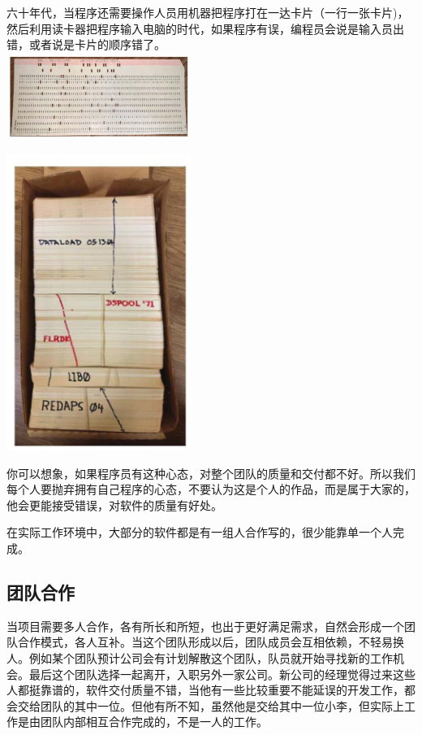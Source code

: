 六十年代，当程序还需要操作人员用机器把程序打在一达卡片（一行一张卡片)，然后利用读卡器把程序输入电脑的时代，如果程序有误，编程员会说是输入员出错，或者说是卡片的顺序错了。\\

\includegraphics[width=6cm]{cleanagile_f33.jpg}


\includegraphics[width=6cm]{cleanagile_f34.jpg}

你可以想象，如果程序员有这种心态，对整个团队的质量和交付都不好。所以我们每个人要抛弃拥有自己程序的心态，不要认为这是个人的作品，而是属于大家的，他会更能接受错误，对软件的质量有好处。

在实际工作环境中，大部分的软件都是有一组人合作写的，很少能靠单一个人完成。

\hypertarget{ux56e2ux961fux7684ux5f62ux6210}{%
\subsection{团队合作}\label{ux56e2ux961fux7684ux5f62ux6210}}

当项目需要多人合作，各有所长和所短，也出于更好满足需求，自然会形成一个团队合作模式，各人互补。当这个团队形成以后，团队成员会互相依赖，不轻易换人。例如某个团队预计公司会有计划解散这个团队，队员就开始寻找新的工作机会。最后这个团队选择一起离开，入职另外一家公司。新公司的经理觉得过来这些人都挺靠谱的，软件交付质量不错，当他有一些比较重要不能延误的开发工作，都会交给团队的其中一位。但他有所不知，虽然他是交给其中一位小李，但实际上工作是由团队内部相互合作完成的，不是一人的工作。

